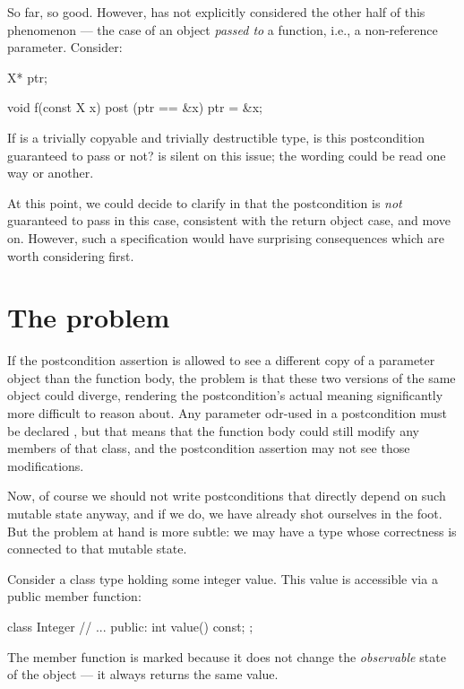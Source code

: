 So far, so good. However, \cite{P2900R10} has not explicitly considered the other half of this phenomenon --- the case of an object \emph{passed to} a function, i.e., a non-reference parameter. Consider:

\begin{codeblock}
X* ptr;

void f(const X x) post (ptr == &x) {
  ptr = &x;
}
\end{codeblock}
If  is a trivially copyable and trivially destructible type, is this postcondition guaranteed to pass or not? \cite{P2900R10} is silent on this issue; the wording could be read one way or another.

At this point, we could decide to clarify in \cite{P2900R10} that the postcondition is \emph{not} guaranteed to pass in this case, consistent with the return object case, and move on. However, such a specification would have surprising consequences which are worth considering first.

\section{The problem}

If the postcondition assertion is allowed to see a different copy of a parameter object than the function body, the problem is that these two versions of the same object could diverge, rendering the postcondition's actual meaning significantly more difficult to reason about. Any parameter odr-used in a postcondition must be declared , but that means that the function body could still modify any  members of that class, and the postcondition assertion may not see those modifications.

Now, of course we should not write postconditions that directly depend on such mutable state anyway, and if we do, we have already shot ourselves in the foot. But the problem at hand is more subtle: we may have a type whose correctness is connected to that mutable state.

Consider a class type holding some integer value. This value is accessible via a public  member function:

\begin{codeblock}
class Integer {
  // ...
public:
  int value() const;
};
\end{codeblock}

The  member function is marked  because it does not change the \emph{observable} state of the object --- it always returns the same value.

